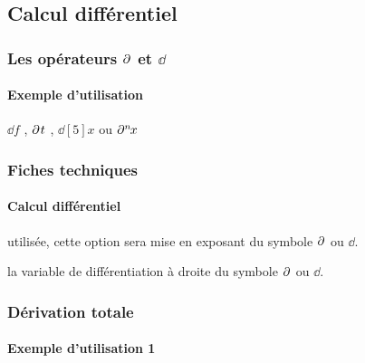\documentclass[12pt,a4paper]{article}
\begin{document}

\subsection{Calcul différentiel}

\subsubsection{\texorpdfstring{Les opérateurs $\pp{}$ et $\dd{}$}%
                               {Les opérateurs "d rond" et "d droit"}}

\paragraph{Exemple d'utilisation}

\begin{latexex}
$\dd{f}$ , $\pp{t}$ ,
$\dd[5]{x}$ ou $\pp[n]{x}$
\end{latexex}




\subsubsection{Fiches techniques}

\paragraph{Calcul différentiel}



\IDoption{} utilisée, cette option sera mise en exposant du symbole $\pp{}$ ou $\dd{}$.

\IDarg{} la variable de différentiation à droite du symbole $\pp{}$ ou $\dd{}$.




\subsubsection{Dérivation totale}

\paragraph{Exemple d'utilisation 1}
\end{document}
